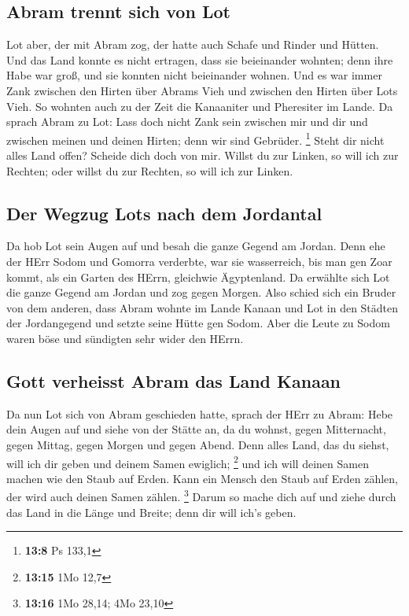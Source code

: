 \hypertarget{abram-trennt-sich-von-lot}{%
\subsection{Abram trennt sich von Lot}\label{abram-trennt-sich-von-lot}}

 Lot aber, der mit Abram zog, der hatte auch Schafe und
Rinder und Hütten.  Und das Land konnte es nicht ertragen,
dass sie beieinander wohnten; denn ihre Habe war groß, und sie konnten
nicht beieinander wohnen.  Und es war immer Zank zwischen
den Hirten über Abrams Vieh und zwischen den Hirten über Lots Vieh. So
wohnten auch zu der Zeit die Kanaaniter und Pheresiter im Lande.
 Da sprach Abram zu Lot: Lass doch nicht Zank sein
zwischen mir und dir und zwischen meinen und deinen Hirten; denn wir
sind Gebrüder. \footnote{\textbf{13:8} Ps 133,1}  Steht
dir nicht alles Land offen? Scheide dich doch von mir. Willst du zur
Linken, so will ich zur Rechten; oder willst du zur Rechten, so will ich
zur Linken.

\hypertarget{der-wegzug-lots-nach-dem-jordantal}{%
\subsection{Der Wegzug Lots nach dem
Jordantal}\label{der-wegzug-lots-nach-dem-jordantal}}

 Da hob Lot sein Augen auf und besah die ganze Gegend am
Jordan. Denn ehe der HErr Sodom und Gomorra verderbte, war sie
wasserreich, bis man gen Zoar kommt, als ein Garten des HErrn, gleichwie
Ägyptenland.  Da erwählte sich Lot die ganze Gegend am
Jordan und zog gegen Morgen. Also schied sich ein Bruder von dem
anderen,  dass Abram wohnte im Lande Kanaan und Lot in
den Städten der Jordangegend und setzte seine Hütte gen Sodom.
 Aber die Leute zu Sodom waren böse und sündigten sehr
wider den HErrn.

\hypertarget{gott-verheisst-abram-das-land-kanaan}{%
\subsection{Gott verheisst Abram das Land
Kanaan}\label{gott-verheisst-abram-das-land-kanaan}}

 Da nun Lot sich von Abram geschieden hatte, sprach der
HErr zu Abram: Hebe dein Augen auf und siehe von der Stätte an, da du
wohnst, gegen Mitternacht, gegen Mittag, gegen Morgen und gegen Abend.
 Denn alles Land, das du siehst, will ich dir geben und
deinem Samen ewiglich; \footnote{\textbf{13:15} 1Mo 12,7}
 und ich will deinen Samen machen wie den Staub auf
Erden. Kann ein Mensch den Staub auf Erden zählen, der wird auch deinen
Samen zählen. \footnote{\textbf{13:16} 1Mo 28,14; 4Mo 23,10}
 Darum so mache dich auf und ziehe durch das Land in die
Länge und Breite; denn dir will ich's geben.

